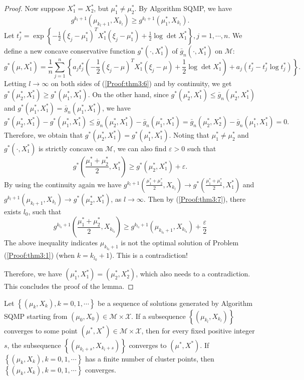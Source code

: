 \begin{proof}
Now suppose $X_1^*=X_2^*$, but $\mu_1^*\not=\mu_2^*$. By Algorithm
SQMP, we have
\begin{equation}\label{Proof:thm3:6}
g^{k_l+1}(\mu_{k_l+1},X_{k_l})\ge g^{k_l+1}(\mu_1^*,X_{k_l}).
\end{equation}
Let $t_j^*=
\exp\left\{-\frac{1}{2}(\xi_j-\mu_1^*)^TX_1^*(\xi_j-\mu_1^*)+
\frac{1}{2}\log\det X_1^*\right\}, j=1,\cdots,n$. We define a new
concave conservative function $g^*(\cdot,X_1^*)$ of $\bar
g_n(\cdot,X_1^*)$ on $\mathcal{M}$:
\begin{equation*}
g^*(\mu,X_1^*)=\frac{1}{n}\sum_{j=1}^n
\left\{a_jt_j^*\left(-\frac{1}{2}(\xi_j-\mu)^TX_1^*(\xi_j-\mu)
+\frac{1}{2}\log\det X_1^*\right)+a_j\left(t_j^*-t_j^*\log
t_j^*\right)\right\}.
\end{equation*}
Letting $l\to \infty$ on both sides of (\ref{Proof:thm3:6}) and by
continuity, we get $g^*(\mu_2^*,X_1^*)\ge g^*(\mu_1^*,X_1^*)$. On
the other hand, since $g^*(\mu_2^*,X_1^*)\le \bar
g_n(\mu_2^*,X_1^*)$ and $g^*(\mu_1^*,X_1^*)=\bar
g_n(\mu_1^*,X_1^*)$, we have \[g^*(\mu_2^*,X_1^*)-
g^*(\mu_1^*,X_1^*)\le \bar g_n(\mu_2^*,X_1^*)-\bar
g_n(\mu_1^*,X_1^*)=\bar g_n(\mu_2^*,X_2^*)-\bar
g_n(\mu_1^*,X_1^*)=0.\] Therefore, we obtain that
$g^*(\mu_2^*,X_1^*)=g^*(\mu_1^*,X_1^*)$. Noting that
$\mu_1^*\not=\mu_2^*$ and $g^*(\cdot,X_1^*)$ is strictly concave on
$\mathcal{M}$, we can also find $\varepsilon>0$ such that
\begin{equation}\label{Proof:thm3:7}
g^*\left(\frac{\mu_1^*+\mu_2^*}{2},X_1^*\right)\ge
g^*\left(\mu_2^*,X_1^*\right)+\varepsilon.
\end{equation}
By using the continuity again we have
$g^{k_l+1}(\frac{\mu_1^*+\mu_2^*}{2},X_{k_l})\to
g^*(\frac{\mu_1^*+\mu_2^*}{2},X_1^*)$ and
$g^{k_l+1}(\mu_{k_l+1},X_{k_l})\to g^*(\mu_2^*,X_1^*)$, as $l \to
\infty$. Then by (\ref{Proof:thm3:7}), there exists $l_0$, such that
\begin{equation*}
g^{k_{l_0}+1}\left(\frac{\mu_1^*+\mu_2^*}{2},X_{k_{l_0}}\right)\ge
g^{k_{l_0}+1}\left(\mu_{k_{l_0}+1},X_{k_{l_0}}\right)+\frac{\varepsilon}{2}
\end{equation*}
The above inequality indicates $\mu_{k_{l_0}+1}$ is not the optimal
solution of Problem (\ref{Proof:thm3:1}) (when $k=k_{l_0}+1$). This
is a contradiction!

Therefore, we have $(\mu_1^*,X_1^*)=(\mu_2^*,X_2^*)$, which also
needs to a contradiction. This concludes the proof of the lemma.
\end{proof}

\begin{lemma}\label{sec:3:prop:3}
Let $\left\{(\mu_k,X_k), k=0,1,\cdots\right\}$ be a sequence of
solutions generated by Algorithm SQMP starting from $(\mu_0,X_0)\in
\mathcal{M}\times \mathcal{X}$. If a subsequence
$\left\{(\mu_{k_l},X_{k_l})\right\}$ converges to some point
$(\mu^*,X^*)\in \mathcal{M}\times \mathcal{X}$, then for every fixed
positive integer $s$, the subsequence
$\left\{(\mu_{k_l+s},X_{k_l+s})\right\}$ converges to $(\mu^*,X^*)$.
If $\left\{(\mu_k,X_k), k=0,1,\cdots\right\}$ has a finite number of
cluster points, then $\left\{(\mu_k,X_k), k=0,1,\cdots\right\}$
converges.
\end{lemma}

